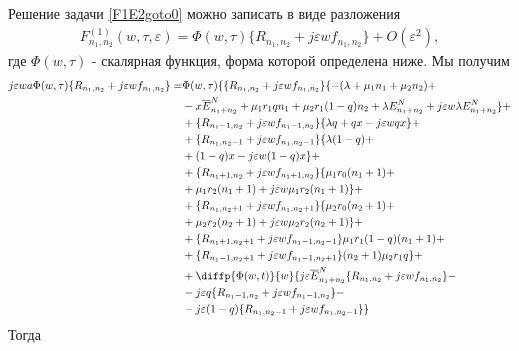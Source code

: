Решение задачи \eqref{F1E2goto0} можно записать в виде разложения
\begin{align}\label{expansionF}
F_{n_{1}, n_{2}}^{(1)}(w,\tau,\varepsilon)=\Phi (w,\tau)\{R_{n_{1}, n_{2}}+j\varepsilon w f_{n_{1}, n_{2}}\}+O(\varepsilon^2),
\end{align}
где $\Phi (w,\tau)$ - скалярная функция, форма которой определена ниже.
Мы получим \\
 \begin{equation}
	\begin{split}
		j\varepsilon wa \Phi (w,\tau)\{R_{n_{1}, n_{2}}+j\varepsilon w f_{n_{1}, n_{2}}\}=
		&\Phi (w,\tau)\{\{R_{n_{1}, n_{2}}+j\varepsilon w f_{n_{1}, n_{2}}\}\{-(\lambda+\mu_{1}n_{1}+\mu_{2}n_{2}) +\\
		&-x\overline{E}_{n_{1}+n_{2}}^N+\mu_{1}r_{1}q n_{1}+ \mu_{2}r_{1}(1-q)n_{2}+ \lambda E_{n_{1}+n_{2}}^N +j\varepsilon w \lambda E_{n_{1}+n_{2}}^N \}+\\
		&+\{R_{n_{1}-1, n_{2}}+j\varepsilon w f_{n_{1}-1, n_{2}}\}\{\lambda q+ q  x-j\varepsilon wq x\}+\\
		&+\{R_{n_{1}, n_{2}-1}+j\varepsilon w f_{n_{1}, n_{2}-1}\}\{\lambda (1-q)+\\
		&+ (1-q) x -j\varepsilon w(1-q) x \}+\\
		&+ \{R_{n_{1}+1, n_{2}}+j\varepsilon w f_{n_{1}+1, n_{2}}\}\{\mu_{1} r_{0}(n_{1}+1)+\\
		& + \mu_{1} r_{2}(n_{1}+1)+j\varepsilon w\mu_{1} r_{2}(n_{1}+1)\}+\\
		&+ \{R_{n_{1}, n_{2}+1}+j\varepsilon w f_{n_{1}, n_{2}+1}\}\{\mu_{2} r_{0}(n_{2}+1)+\\
		& + \mu_{2} r_{2} (n_{2}+1) +j\varepsilon w\mu_{2} r_{2} (n_{2}+1)\}+\\
		&+\{R_{n_{1}+1, n_{2}+1}+j\varepsilon w f_{n_{1}-1, n_{2}-1}\}\mu_{1} r_{1}(1-q)(n_{1}+1) +\\
		&+\{R_{n_{1}-1, n_{2}+1}+j\varepsilon w f_{n_{1}-1, n_{2}+1}\}(n_{2}+1)\mu_{2} r_{1}q\}  +\\
		&+ \diffp{\Phi(w,t)}{w}\{j\varepsilon \overline{E}_{n_{1}+n_{2}}^N\{R_{n_{1}, n_{2}}+j\varepsilon w f_{n_{1}, n_{2}}\}-\\
		&-  j\varepsilon q  \{R_{n_{1}-1, n_{2}}+j\varepsilon w f_{n_{1}-1, n_{2}}\}-\\
		&- j \varepsilon (1-q) \{R_{n_{1}, n_{2}-1}+j\varepsilon w f_{n_{1}, n_{2}-1}\}\}
	\end{split}
\end{equation}
Тогда
